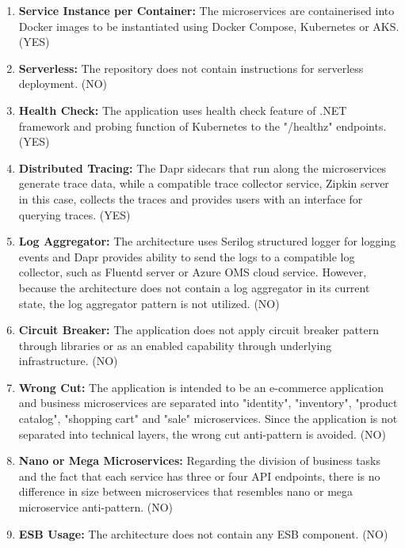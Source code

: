 \documentclass{Configuration_Files/PoliMi3i_thesis}
\begin{document}
\begin{enumerate}
    \item \textbf{Service Instance per Container:} The microservices are containerised into Docker images to be instantiated using Docker Compose, Kubernetes or AKS. (YES)
    
    \item \textbf{Serverless:} The repository does not contain instructions for serverless deployment. (NO)
    
    \item \textbf{Health Check:} The application uses health check feature of .NET framework and probing function of Kubernetes to the "/healthz" endpoints. (YES)
    
    \item \textbf{Distributed Tracing:} The Dapr sidecars that run along the microservices generate trace data, while a compatible trace collector service, Zipkin server in this case, collects the traces and provides users with an interface for querying traces. (YES)
    
    \item \textbf{Log Aggregator:} The architecture uses Serilog structured logger for logging events and Dapr provides ability to send the logs to a compatible log collector, such as Fluentd server or Azure OMS cloud service.
    However, because the architecture does not contain a log aggregator in its current state, the log aggregator pattern is not utilized. (NO)
    
    \item \textbf{Circuit Breaker:} The application does not apply circuit breaker pattern through libraries or as an enabled capability through underlying infrastructure. (NO)
    
    \item \textbf{Wrong Cut:} The application is intended to be an e-commerce application and business microservices are separated into "identity", "inventory", "product catalog", "shopping cart" and "sale" microservices.
    Since the application is not separated into technical layers, the wrong cut anti-pattern is avoided. (NO)
    
    \item \textbf{Nano or Mega Microservices:} Regarding the division of business tasks and the fact that each service has three or four API endpoints, there is no difference in size between microservices that resembles nano or mega microservice anti-pattern. (NO)
    
    \item \textbf{ESB Usage:} The architecture does not contain any ESB component. (NO)
    

\end{enumerate}
\end{document}
